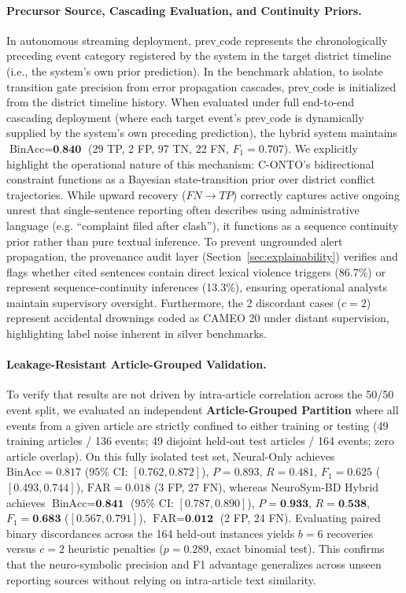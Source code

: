 \documentclass[11pt,a4paper]{article}
\begin{document}
\paragraph{Precursor Source, Cascading Evaluation, and Continuity Priors.}
In autonomous streaming deployment, $\text{prev\_code}$ represents the chronologically preceding event category registered by the system in the target district timeline (i.e., the system's own prior prediction). In the benchmark ablation, to isolate transition gate precision from error propagation cascades, $\text{prev\_code}$ is initialized from the district timeline history. When evaluated under full end-to-end cascading deployment (where each target event's $\text{prev\_code}$ is dynamically supplied by the system's own preceding prediction), the hybrid system maintains $\text{BinAcc} = \textbf{0.840}$ (29 TP, 2 FP, 97 TN, 22 FN, $F_1 = 0.707$).
We explicitly highlight the operational nature of this mechanism: C-ONTO's bidirectional constraint functions as a Bayesian state-transition prior over district conflict trajectories. While upward recovery ($FN \to TP$) correctly captures active ongoing unrest that single-sentence reporting often describes using administrative language (e.g. ``complaint filed after clash''), it functions as a sequence continuity prior rather than pure textual inference. To prevent ungrounded alert propagation, the provenance audit layer (Section~\ref{sec:explainability}) verifies and flags whether cited sentences contain direct lexical violence triggers (86.7\%) or represent sequence-continuity inferences (13.3\%), ensuring operational analysts maintain supervisory oversight. Furthermore, the 2 discordant cases ($c=2$) represent accidental drownings coded as CAMEO 20 under distant supervision, highlighting label noise inherent in silver benchmarks.

\paragraph{Leakage-Resistant Article-Grouped Validation.}
To verify that results are not driven by intra-article correlation across the 50/50 event split, we evaluated an independent \textbf{Article-Grouped Partition} where all events from a given article are strictly confined to either training or testing (49 training articles / 136 events; 49 disjoint held-out test articles / 164 events; zero article overlap).
On this fully isolated test set, Neural-Only achieves $\text{BinAcc} = 0.817$ ($95\%$ CI: $[0.762, 0.872]$), $P = 0.893$, $R = 0.481$, $F_1 = 0.625$ ($[0.493, 0.744]$), $\text{FAR} = 0.018$ (3 FP, 27 FN), whereas NeuroSym-BD Hybrid achieves $\text{BinAcc} = \textbf{0.841}$ ($95\%$ CI: $[0.787, 0.890]$), $P = \textbf{0.933}$, $R = \textbf{0.538}$, $F_1 = \textbf{0.683}$ ($[0.567, 0.791]$), $\text{FAR} = \textbf{0.012}$ (2 FP, 24 FN).
Evaluating paired binary discordances across the 164 held-out instances yields $b = 6$ recoveries versus $c = 2$ heuristic penalties ($p = 0.289$, exact binomial test).
This confirms that the neuro-symbolic precision and F1 advantage generalizes across unseen reporting sources without relying on intra-article text similarity.
\end{document}
